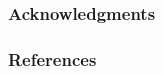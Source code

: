 \documentclass{article} %
\begin{document}
\subsubsection*{Acknowledgments}



\subsubsection*{References}




\end{document}
